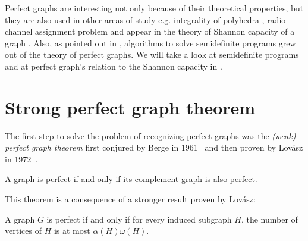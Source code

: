 Perfect graphs are interesting not only because of their theoretical properties, but they are also used in other areas of study e.g. integrality of polyhedra \cite{Chvtal1975, Chudnovsky2003}, radio channel assignment problem \cite{McDiarmid99, McDiarmid2000} and appear in the theory of Shannon capacity of a graph \cite{Lovasz1979}. Also, as pointed out in \cite{alfonsinPerfect2001, Chudnovsky2003}, algorithms to solve semidefinite programs grew out of the theory of perfect graphs. We will take a look at semidefinite programs and at perfect graph's relation to the Shannon capacity in .

\section{Strong perfect graph theorem}
\label{sec:SPGT}

The first step to solve the problem of recognizing perfect graphs was the \emph{(weak) perfect graph theorem} first conjured by Berge in 1961~\cite{CB61} and then proven by Lovász in 1972~\cite{LL72}.

\begin{theorem}
	\label{thm:pgt}
	A graph is perfect if and only if its complement graph is also perfect.
\end{theorem}

This theorem is a consequence of a stronger result proven by Lovász:
\begin{theorem}
	\label{thm:omegaalpha}
	A graph $G$ is perfect if and only if for every induced subgraph $H$, the number of vertices of $H$ is at most $\alpha(H)\omega(H)$.
\end{theorem}



